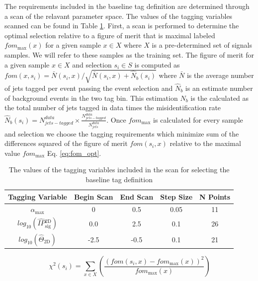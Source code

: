 The requirements included in the baseline tag definition are determined through a scan of the relavant parameter space. The values
of the tagging variables scanned can be found in Table \ref{tab:scan_space}. First, a scan is performed to determine the optimal 
selection relative to a figure of merit that is maximal labeled $fom_{\textrm{max}}(x)$ for a given sample $x\in X$ where $X$ is a pre-determined set of signals samples.
 We will refer to these samples as the training set.
The figure of merit for a given sample $x\in X$ and selection $s_{i} \in S$ is computed as $fom(x,s_i) = \bar{N}(s_i,x)/ \sqrt{\bar{N}(s_i,x) + \widehat{N}_b(s_i)}$ where 
$\bar{N}$ is the average number of jets tagged per event passing the event selection and $\hat{N}_{b}$ is an estimate number of background events
 in the two tag bin. This estimation $\hat{N}_b$ is the  calculated as the total number of jets tagged in data times the misidentification rate $\hat{N}_{b}(s_i) = N^{data}_{jets-tagged} \times \frac{N_{jets-tagged}^{data}}{N_{jets}^{data}}$.  
Once $fom_{\textrm{max}}$ is calculated for every sample and selection we choose the tagging requirements which minimize sum of the differences squared of the figure of merit
$fom(s_i,x)$ relative to the maximal value $fom_{\textrm{max}}$  Eq. \ref{eq:fom_opt}.

\begin{table}
\caption{The values of the tagging variables included in the scan for selecting the baseline tag definition  \label{tab:scan_space}}
\begin{center}
\begin{tabular}{ccccc}
\textbf{Tagging Variable} & \textbf{Begin Scan} & \textbf{End Scan} & \textbf{Step Size} & \textbf{N Points}\\
\hline 
$\alpha_{\textrm{max}}$  & 0 &  0.5 & 0.05 & 11\\
$log_{10}(\widehat{IP}{}^{\textrm{2D}}_{\textrm{sig}})$  & 0.0 & 2.5 & 0.1 & 26\\
$log_{10}(\widehat{\Theta}_{\textrm{2D}})$  &  -2.5 & -0.5 & 0.1 & 21 \\
\end{tabular}
\end{center}
\end{table}

\begin{equation}
\chi^2(s_i)  =  \sum_{x\in X} \left (\frac{(fom(s_i,x) - fom_{\textrm{max}}(x))^{2}}{ fom_{\textrm{max}}(x)} \right)
\label{eq:fom_opt}
\end{equation}

